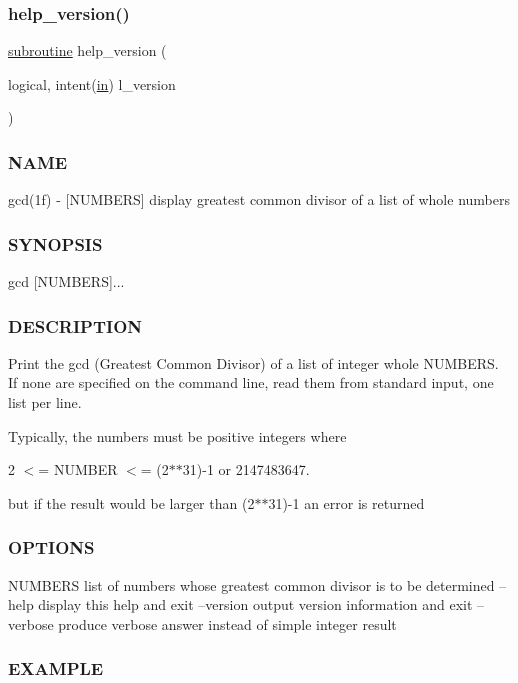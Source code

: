 \subsubsection{\texorpdfstring{help\+\_\+version()}{help\_version()}}
{\footnotesize\ttfamily \hyperlink{M__stopwatch_83_8txt_acfbcff50169d691ff02d4a123ed70482}{subroutine} help\+\_\+version (\begin{DoxyParamCaption}\item[{logical, intent(\hyperlink{M__journal_83_8txt_afce72651d1eed785a2132bee863b2f38}{in})}]{l\+\_\+version }\end{DoxyParamCaption})}



\subsubsection*{N\+A\+ME}

gcd(1f) -\/ \mbox{[}N\+U\+M\+B\+E\+RS\mbox{]} display greatest common divisor of a list of whole numbers 

\subsubsection*{S\+Y\+N\+O\+P\+S\+IS}

\begin{DoxyVerb}    gcd [NUMBERS]...
\end{DoxyVerb}


\subsubsection*{D\+E\+S\+C\+R\+I\+P\+T\+I\+ON}

Print the gcd (Greatest Common Divisor) of a list of integer whole N\+U\+M\+B\+E\+RS. If none are specified on the command line, read them from standard input, one list per line.

Typically, the numbers must be positive integers where

2 $<$= N\+U\+M\+B\+ER $<$= (2$\ast$$\ast$31)-\/1 or 2147483647.

but if the result would be larger than (2$\ast$$\ast$31)-\/1 an error is returned

\subsubsection*{O\+P\+T\+I\+O\+NS}

N\+U\+M\+B\+E\+RS list of numbers whose greatest common divisor is to be determined --help display this help and exit --version output version information and exit --verbose produce verbose answer instead of simple integer result \subsubsection*{E\+X\+A\+M\+P\+LE}

